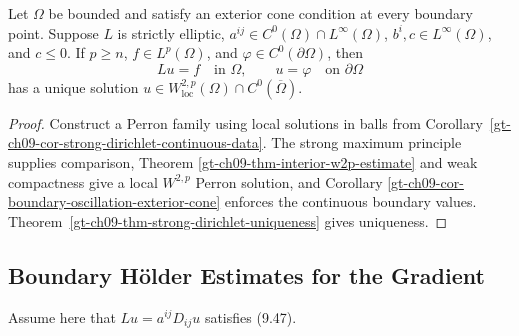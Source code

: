 \begin{theorem}
\label{gt-ch09-thm-dirichlet-exterior-cone}
Let $\Omega$ be bounded and satisfy an exterior cone condition at every
boundary point.  Suppose $L$ is strictly elliptic,
$a^{ij}\in C^0(\Omega)\cap L^\infty(\Omega)$,
$b^i,c\in L^\infty(\Omega)$, and $c\le0$.  If $p\ge n$,
$f\in L^p(\Omega)$, and $\varphi\in C^0(\partial\Omega)$, then
\[
Lu=f\quad\text{in }\Omega,\qquad u=\varphi\quad\text{on }\partial\Omega
\]
has a unique solution
$u\in W^{2,p}_{\mathrm{loc}}(\Omega)\cap C^0(\overline\Omega)$.
\end{theorem}
\begin{proof}
\sketch Construct a Perron family using local solutions in balls from
Corollary~\ref{gt-ch09-cor-strong-dirichlet-continuous-data}.
The strong maximum principle supplies comparison, Theorem
\ref{gt-ch09-thm-interior-w2p-estimate} and weak compactness give a local
$W^{2,p}$ Perron solution, and Corollary
\ref{gt-ch09-cor-boundary-oscillation-exterior-cone} enforces the continuous
boundary values.  Theorem~\ref{gt-ch09-thm-strong-dirichlet-uniqueness}
gives uniqueness.
\end{proof}

\subsection*{Boundary H\"older Estimates for the Gradient}

Assume here that $Lu=a^{ij}D_{ij}u$ satisfies (9.47).

